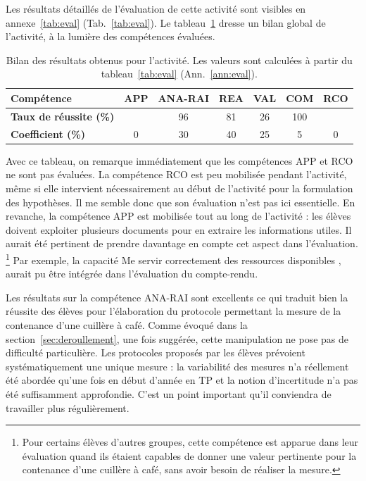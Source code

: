 \documentclass[12pt,a4paper, fleqn]{report}
\newcommand{\app}{\colorbox{bleu_c}{\textcolor{bleu_f}{APP}}}
\newcommand{\rea}{\colorbox{yellow_c}{\textcolor{yellow_f}{REA}}}
\newcommand{\anarai}{\colorbox{green_c}{\textcolor{green_f}{ANA-RAI}}}
\newcommand{\val}{\colorbox{orange_c}{\textcolor{orange_f}{VAL}}}
\newcommand{\com}{\colorbox{red_c}{\textcolor{red_f}{COM}}}
\newcommand{\rco}{\colorbox{gray_c}{\textcolor{gray_f}{RCO}}}
\begin{document}
Les résultats détaillés de l'évaluation de cette activité sont visibles en annexe~\ref{tab:eval} (Tab.~\ref{tab:eval}).
Le tableau~\ref{tab:bilan_cptces} dresse un bilan global de l'activité, à la lumière des compétences évaluées.

\begin{table}[htbp]
\center
\renewcommand\arraystretch{1.5}		%
\begin{tabular}{|l|c|c|c|c|c|c|}
\hline
\textbf{Compétence} 				& \app{} 	& \anarai{}	& \rea{}	& \val{}	& \com{}	& \rco{} 	\\
\hline
\textbf{Taux de réussite (\%)}	& 				&	96			&	81		&	26		& 	100		&				\\
\hline
\textbf{Coefficient (\%)	}			& 0			&	30			& 40		& 25		&	5			& 0			\\
\hline
\end{tabular}
\caption{Bilan des résultats obtenus pour l'activité.
Les valeurs  sont calculées à partir du tableau~\ref{tab:eval} (Ann.~\ref{ann:eval}).}
\label{tab:bilan_cptces}
\end{table}

Avec ce tableau, on remarque immédiatement que les compétences \app{} et \rco{} ne sont pas évaluées.
La compétence \rco{} est peu mobilisée pendant l'activité, même si elle intervient nécessairement au début de l'activité pour la formulation des hypothèses.
Il me semble donc que son évaluation n'est pas ici essentielle.
En revanche, la compétence \app{} est mobilisée tout au long de l'activité : les élèves doivent exploiter plusieurs documents pour en extraire les informations utiles.
Il aurait été pertinent de prendre davantage en compte cet aspect dans l'évaluation.
\footnote{Pour certains élèves d'autres groupes, cette compétence est apparue dans leur évaluation quand ils étaient capables de donner une valeur pertinente pour la contenance d'une cuillère à café, sans avoir besoin de réaliser la mesure.}
Par exemple, la capacité \og Me servir correctement des ressources disponibles \fg{}, aurait pu être intégrée dans l'évaluation du compte-rendu.

Les résultats sur la compétence \anarai{} sont excellents ce qui traduit bien la réussite des élèves pour l'élaboration du protocole permettant la mesure de la contenance d'une cuillère à café.
Comme évoqué dans la section~\ref{sec:deroullement}, une fois suggérée, cette manipulation ne pose pas de difficulté particulière.
Les protocoles proposés par les élèves prévoient systématiquement une unique mesure : la variabilité des mesures n'a réellement été abordée qu'une fois en début d'année en TP et la notion d'incertitude n'a pas été suffisamment approfondie.
C'est un point important qu'il conviendra de travailler plus régulièrement.
\end{document}
